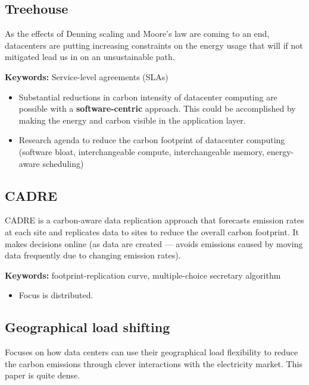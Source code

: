 \subsection{Treehouse \cite{andersonTreehouseCaseCarbonAware2022}} 

As the effects of Denning scaling and Moore's law are coming to an end, datacenters are putting increasing constraints on the energy usage that will if not mitigated lead us in on an unsustainable path. 

\textbf{Keywords: } Service-level agreements (SLAs)
\begin{itemize}
    \item Substantial reductions in carbon intensity of datacenter computing are possible with a \textbf{software-centric} approach. This could be accomplished by making the energy and carbon visible in the application layer.
    \item Research agenda to reduce the carbon footprint of datacenter computing (software bloat, interchangeable compute, interchangeable memory, energy-aware scheduling)
\end{itemize}
    
    

\subsection{CADRE \cite{xuCADRECarbonAwareData2015}}
CADRE is a carbon-aware data replication approach that forecasts emission rates at each site and replicates data to sites to reduce the overall carbon footprint. It makes decisions online (as data are created --- avoids emissions caused by moving data frequently due to changing emission rates).

\textbf{Keywords: } footprint-replication curve, multiple-choice secretary algorithm

\begin{itemize}
    \item Focus is distributed.
\end{itemize}

\subsection{Geographical load shifting \cite{lindbergGuideReducingCarbon2021}}
Focuses on how data centers can use their geographical load flexibility to reduce the carbon emissions through clever interactions with the electricity market. This paper is quite dense.


